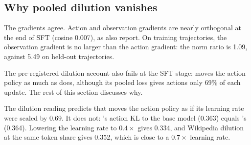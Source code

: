 \begin{table}[t]
\centering\small
{}
\caption{SFT-stage measurements on held-out trajectories. Columns: action KL to Qwen3-4B; CE on actions, observation payload and observation template; cosine and norm ratio of the observation and action gradients, summed over tokens. On training trajectories the ratio is 1.09 for \armB{} and 5.87 for \armA{}.}
\label{tab:sftmeas}
\end{table}

\subsection{Why pooled dilution vanishes}
\label{sec:share}\label{app:share}
The gradients agree. Action and observation gradients are nearly orthogonal at the end of SFT (cosine 0.007), as \citet{zhang2026actobs} also report. On training trajectories, the observation gradient is no larger than the action gradient: the norm ratio is 1.09, against 5.49 on held-out trajectories.

The pre-registered dilution account also fails at the SFT stage: \armB{} moves the action policy as much as \armA{} does, although its pooled loss gives actions only 69\% of each update. The rest of this section discusses why.

The dilution reading predicts that \armB{} moves the action policy as if its learning rate were scaled by 0.69. It does not: \armB's action KL to the base model (0.363) equals \armA's (0.364). Lowering the learning rate to $0.4\times$ gives 0.334, and Wikipedia dilution at the same token share gives 0.352, which is close to a $0.7\times$ learning rate.

